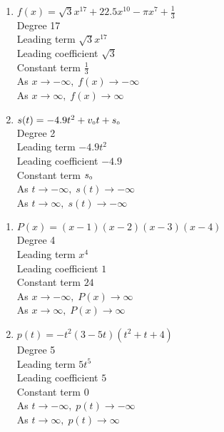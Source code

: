\begin{multicols}{2}
\begin{enumerate}
\setcounter{enumi}{\value{HW}}

\item $f(x) = \sqrt{3}x^{17} + 22.5x^{10} - \pi x^{7} + \frac{1}{3}$\\
Degree 17 \\
Leading term $\sqrt{3}x^{17}$\\
Leading coefficient $\sqrt{3}$\\
Constant term $\frac{1}{3}$\\
As $x \rightarrow -\infty, \; f(x) \rightarrow -\infty$\\
As $x \rightarrow \infty, \; f(x) \rightarrow \infty$\\


\item $s(t) = -4.9t^{2} + v_{\mbox{\tiny $0$}}t + s_{\mbox{\tiny $0$}}$\\
Degree 2 \\
Leading term $-4.9t^{2}$\\
Leading coefficient $-4.9$\\
Constant term $s_{\mbox{\tiny $0$}}$\\
As $t \rightarrow -\infty, \; s(t) \rightarrow -\infty$\\
As $t \rightarrow \infty, \; s(t) \rightarrow -\infty$\\


\setcounter{HW}{\value{enumi}}
\end{enumerate}
\end{multicols}

\begin{multicols}{2}
\begin{enumerate}
\setcounter{enumi}{\value{HW}}


\item $P(x) = (x - 1)(x - 2)(x - 3)(x - 4)$\\
Degree 4 \\
Leading term $x^{4}$\\
Leading coefficient $1$\\
Constant term $24$\\
As $x \rightarrow -\infty, \; P(x) \rightarrow \infty$\\
As $x \rightarrow \infty, \; P(x) \rightarrow \infty$\\

\item $p(t) = -t^2(3 - 5t)(t^{2} + t + 4)$\\
Degree 5 \\
Leading term $5t^{5}$\\
Leading coefficient $5$\\
Constant term $0$\\
As $t \rightarrow -\infty, \; p(t) \rightarrow -\infty$\\
As $t \rightarrow \infty, \; p(t) \rightarrow \infty$\\

\setcounter{HW}{\value{enumi}}
\end{enumerate}
\end{multicols}

